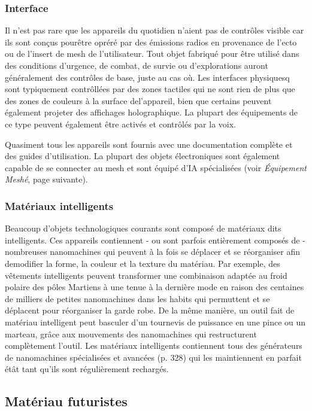 \subsubsection{Interface} 

Il n'est pas rare que les appareils du quotidien n'aient pas de contrôles visible car ils sont conçus pourêtre opréré par des émissions radios en provenance de l'ecto ou de l'insert de mesh de l'utilisateur. Tout objet fabriqué pour être utilisé dans des conditions d'urgence, de combat, de survie ou d'explorations auront généralement des contrôles de base, juste au cas où. Les interfaces physiquesq sont typiquement contrôllées par des zones tactiles qui ne sont rien de plus que des zones de couleurs à la surface del'appareil, bien que certains peuvent également projeter des affichages holographique. La plupart des équipements de ce type peuvent également être activés et contrôlés par la voix. 

Quasiment tous les appareils sont fournis avec une documentation complète et des guides d'utilisation. La plupart des objets électroniques sont également capable de se connecter au mesh et sont équipé d'IA spécialisées (voir \emph{Équipement Meshé}, page suivante). 

\subsubsection{Matériaux intelligents} 

Beaucoup d'objets technologiques courants sont composé de matériaux dits intelligents. Ces appareils contiennent - ou sont parfois entièrement composés de - nombreuses nanomachines qui peuvent à la fois se déplacer et se réorganiser afin demodifier la forme, la couleur et la texture du matériau. Par exemple, des vêtements intelligents peuvent transformer une combinaison adaptée au froid polaire des pôles Martiens à une tenue à la dernière mode en raison des centaines de milliers de petites nanomachines dans les habits qui permuttent et se déplacent pour réorganiser la garde robe. De la même manière, un outil fait de matériau intelligent peut basculer d'un tournevis de puissance en une pince ou un marteau, grâce aux mouvements des nanomachines qui restructurent complètement l'outil. Les matériaux intelligents contiennent tous des générateurs de nanomachines spécialisées et avancées (p. 328) qui les maintiennent en parfait étât tant qu'ils sont régulièrement rechargés. 



\subsection{Matériau futuristes} \label{sec:future-materials} 

